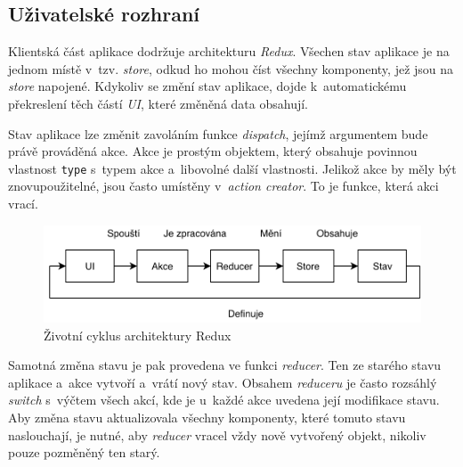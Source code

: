 \documentclass[a4paper,12pt]{article}
\def\code#1{\texttt{#1}}
\begin{document}



\subsection{Uživatelské rozhraní}

Klientská část aplikace dodržuje architekturu \textit{Redux}. Všechen stav aplikace je na jednom místě v~tzv. \textit{store}, odkud ho mohou číst všechny komponenty, jež jsou na \textit{store} napojené. Kdykoliv se změní stav aplikace, dojde k~automatickému překreslení těch částí \textit{UI}, které změněná data obsahují.~\cite{reactbook}

Stav aplikace lze změnit zavoláním funkce \textit{dispatch}, jejímž argumentem bude právě prováděná akce. Akce je prostým objektem, který obsahuje povinnou vlastnost \code{type} s~typem akce a~libovolné další vlastnosti. Jelikož akce by měly být znovupoužitelné, jsou často umístěny v~\textit{action creator}. To je funkce, která akci vrací.~\cite{reactbook}

\begin{figure}[H]
\begin{center}
\includegraphics[width=350pt]{Images/Redux.png}
\caption[Životní cyklus architektury Redux]{Životní cyklus architektury Redux \footnotemark}
\end{center}
\end{figure}


Samotná změna stavu je pak provedena ve funkci \textit{reducer}. Ten ze starého stavu aplikace a~akce vytvoří a~vrátí nový stav.  Obsahem \textit{reduceru} je často rozsáhlý \textit{switch} s~výčtem všech akcí, kde je u~každé akce uvedena její modifikace stavu. Aby změna stavu aktualizovala všechny komponenty, které tomuto stavu naslouchají, je nutné, aby \textit{reducer} vracel vždy nově vytvořený objekt, nikoliv pouze pozměněný ten starý.~\cite{reactbook}


\end{document}
